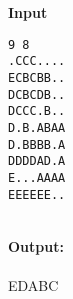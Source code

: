 \textbf{Input}
\begin{verbatim}
9 8
.CCC....
ECBCBB..
DCBCDB..
DCCC.B..
D.B.ABAA
D.BBBB.A
DDDDAD.A
E...AAAA
EEEEEE..
\end{verbatim}


\\\textbf{Output:}
\\
\\EDABC

 